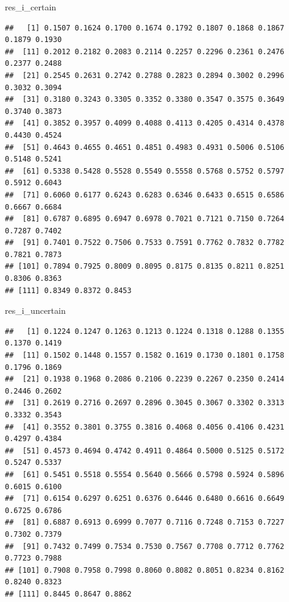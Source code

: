 \documentclass[]{article}
\newenvironment{Shaded}{\begin{snugshade}}{\end{snugshade}}
\newcommand{\NormalTok}[1]{{#1}}
\begin{document}
\begin{Shaded}
\begin{Highlighting}[]
\NormalTok{res_i_certain}
\end{Highlighting}
\end{Shaded}

\begin{verbatim}
##   [1] 0.1507 0.1624 0.1700 0.1674 0.1792 0.1807 0.1868 0.1867 0.1879 0.1930
##  [11] 0.2012 0.2182 0.2083 0.2114 0.2257 0.2296 0.2361 0.2476 0.2377 0.2488
##  [21] 0.2545 0.2631 0.2742 0.2788 0.2823 0.2894 0.3002 0.2996 0.3032 0.3094
##  [31] 0.3180 0.3243 0.3305 0.3352 0.3380 0.3547 0.3575 0.3649 0.3740 0.3873
##  [41] 0.3852 0.3957 0.4099 0.4088 0.4113 0.4205 0.4314 0.4378 0.4430 0.4524
##  [51] 0.4643 0.4655 0.4651 0.4851 0.4983 0.4931 0.5006 0.5106 0.5148 0.5241
##  [61] 0.5338 0.5428 0.5528 0.5549 0.5558 0.5768 0.5752 0.5797 0.5912 0.6043
##  [71] 0.6060 0.6177 0.6243 0.6283 0.6346 0.6433 0.6515 0.6586 0.6667 0.6684
##  [81] 0.6787 0.6895 0.6947 0.6978 0.7021 0.7121 0.7150 0.7264 0.7287 0.7402
##  [91] 0.7401 0.7522 0.7506 0.7533 0.7591 0.7762 0.7832 0.7782 0.7821 0.7873
## [101] 0.7894 0.7925 0.8009 0.8095 0.8175 0.8135 0.8211 0.8251 0.8306 0.8363
## [111] 0.8349 0.8372 0.8453
\end{verbatim}

\begin{Shaded}
\begin{Highlighting}[]
\NormalTok{res_i_uncertain}
\end{Highlighting}
\end{Shaded}

\begin{verbatim}
##   [1] 0.1224 0.1247 0.1263 0.1213 0.1224 0.1318 0.1288 0.1355 0.1370 0.1419
##  [11] 0.1502 0.1448 0.1557 0.1582 0.1619 0.1730 0.1801 0.1758 0.1796 0.1869
##  [21] 0.1938 0.1968 0.2086 0.2106 0.2239 0.2267 0.2350 0.2414 0.2446 0.2602
##  [31] 0.2619 0.2716 0.2697 0.2896 0.3045 0.3067 0.3302 0.3313 0.3332 0.3543
##  [41] 0.3552 0.3801 0.3755 0.3816 0.4068 0.4056 0.4106 0.4231 0.4297 0.4384
##  [51] 0.4573 0.4694 0.4742 0.4911 0.4864 0.5000 0.5125 0.5172 0.5247 0.5337
##  [61] 0.5451 0.5518 0.5554 0.5640 0.5666 0.5798 0.5924 0.5896 0.6015 0.6100
##  [71] 0.6154 0.6297 0.6251 0.6376 0.6446 0.6480 0.6616 0.6649 0.6725 0.6786
##  [81] 0.6887 0.6913 0.6999 0.7077 0.7116 0.7248 0.7153 0.7227 0.7302 0.7379
##  [91] 0.7432 0.7499 0.7534 0.7530 0.7567 0.7708 0.7712 0.7762 0.7723 0.7988
## [101] 0.7908 0.7958 0.7998 0.8060 0.8082 0.8051 0.8234 0.8162 0.8240 0.8323
## [111] 0.8445 0.8647 0.8862
\end{verbatim}
\end{document}
